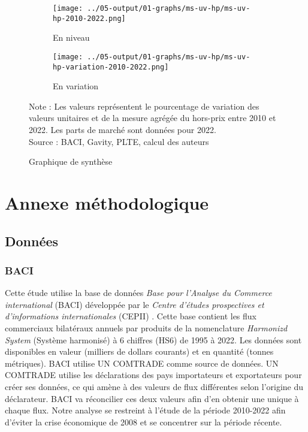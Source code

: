\documentclass[french,10pt,a4paper]{article}
\begin{document}
\begin{figure}[!h]
  \centering
  \begin{subfigure}{\textwidth}
    \centering    \texttt{[image: ../05-output/01-graphs/ms-uv-hp/ms-uv-hp-2010-2022.png]}
    \caption{En niveau}
    \label{fig:ms-uv-hp}
  \end{subfigure}
  \vspace{0.5cm}
  \begin{subfigure}{\textwidth}
    \centering \texttt{[image: ../05-output/01-graphs/ms-uv-hp/ms-uv-hp-variation-2010-2022.png]}
 \caption{En variation}
 \label{fig:ms-uv-hp-variation}
  \end{subfigure}
  \captionsetup{justification=justified, singlelinecheck=false, font=small}
  \caption*{Note : Les valeurs représentent le pourcentage de variation des valeurs unitaires et de la mesure agrégée du hors-prix entre 2010 et 2022. Les parts de marché sont données pour 2022.\\
  Source : BACI, Gavity, PLTE, calcul des auteurs}
  \captionsetup{justification=centering, singlelinecheck=true, font=normalsize}
  \caption{Graphique de synthèse}
  \label{fig:graph-synthese}
\end{figure}


\newpage

\section*{Annexe méthodologique}
\subsection*{Données}
\subsubsection*{BACI}
Cette étude utilise la base de données \textit{Base pour l'Analyse du Commerce international} (BACI) développée par le \textit{Centre d'études prospectives et d'informations internationales} (CEPII) \citep{Gaulier2010}. Cette base contient les flux commerciaux bilatéraux annuels par produits de la nomenclature \textit{Harmonizd System} (Système harmonisé) à 6 chiffres (HS6) de 1995 à 2022. Les données sont disponibles en valeur (milliers de dollars courants) et en quantité (tonnes métriques). BACI utilise UN COMTRADE comme source de données. UN COMTRADE utilise les déclarations des pays importateurs et exportateurs pour créer ses données, ce qui amène à des valeurs de flux différentes selon l'origine du déclarateur. BACI va réconcilier ces deux valeurs afin d'en obtenir une unique à chaque flux. Notre analyse se restreint à l'étude de la période 2010-2022 afin d'éviter la crise économique de 2008 et se concentrer sur la période récente.
\end{document}
